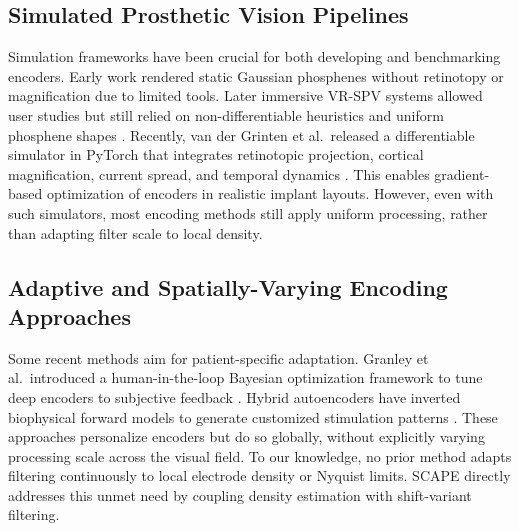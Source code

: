 \subsection{Simulated Prosthetic Vision Pipelines}
Simulation frameworks have been crucial for both developing and benchmarking encoders. Early work rendered static Gaussian phosphenes without retinotopy or magnification due to limited tools. Later immersive VR-SPV systems allowed user studies but still relied on non-differentiable heuristics and uniform phosphene shapes \cite{Kasowski2022}. Recently, van der Grinten et al.\ released a differentiable simulator in PyTorch that integrates retinotopic projection, cortical magnification, current spread, and temporal dynamics \cite{vanderGrinten2024}. This enables gradient-based optimization of encoders in realistic implant layouts. However, even with such simulators, most encoding methods still apply uniform processing, rather than adapting filter scale to local density.

\subsection{Adaptive and Spatially-Varying Encoding Approaches}
Some recent methods aim for patient-specific adaptation. Granley et al.\ introduced a human-in-the-loop Bayesian optimization framework to tune deep encoders to subjective feedback \cite{Granley2023}. Hybrid autoencoders have inverted biophysical forward models to generate customized stimulation patterns \cite{Granley2022,deRuytervanSteveninck2020}. These approaches personalize encoders but do so globally, without explicitly varying processing scale across the visual field. To our knowledge, no prior method adapts filtering continuously to local electrode density or Nyquist limits. SCAPE directly addresses this unmet need by coupling density estimation with shift-variant filtering.
